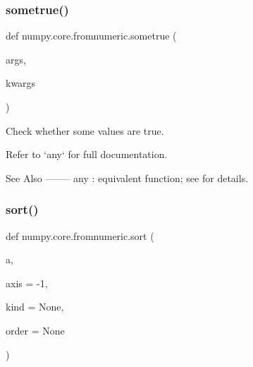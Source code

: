 \subsubsection{\texorpdfstring{sometrue()}{sometrue()}}
{\footnotesize\ttfamily def numpy.\+core.\+fromnumeric.\+sometrue (\begin{DoxyParamCaption}\item[{}]{args,  }\item[{}]{kwargs }\end{DoxyParamCaption})}

\begin{DoxyVerb}Check whether some values are true.

Refer to `any` for full documentation.

See Also
--------
any : equivalent function; see for details.
\end{DoxyVerb}
 \mbox{\label{namespacenumpy_1_1core_1_1fromnumeric_ad2703582ce49137ac1907dca186ae171}} 
\subsubsection{\texorpdfstring{sort()}{sort()}}
{\footnotesize\ttfamily def numpy.\+core.\+fromnumeric.\+sort (\begin{DoxyParamCaption}\item[{}]{a,  }\item[{}]{axis = {\ttfamily -\/1},  }\item[{}]{kind = {\ttfamily None},  }\item[{}]{order = {\ttfamily None} }\end{DoxyParamCaption})}


